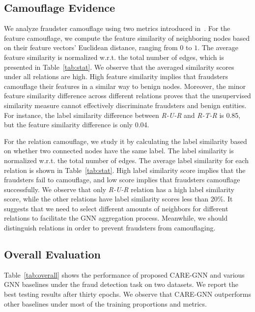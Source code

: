 \subsection{Camouflage Evidence}
\label{sec05:camoflage}
We analyze fraudster camouflage using two metrics introduced in~\cite{liu2020alleviating}. 
For the feature camouflage, we compute the feature similarity of neighboring nodes based on their feature vectors' Euclidean distance, ranging from $0$ to $1$.
The average feature similarity is normalized w.r.t. the total number of edges, which is presented in Table~\ref{tab:stat}.
We observe that the averaged similarity scores under all relations are high.
High feature similarity implies that fraudsters camouflage their features in a similar way to benign nodes.
Moreover, the minor feature similarity difference across different relations proves that the unsupervised similarity measure cannot effectively discriminate fraudsters and benign entities.
For instance, the label similarity difference between \textit{R-U-R} and \textit{R-T-R} is 0.85, but the feature similarity difference is only 0.04.  

For the relation camouflage, we study it by calculating the label similarity based on whether two connected nodes have the same label.
The label similarity is normalized w.r.t. the total number of edges.
The average label similarity for each relation is shown in Table~\ref{tab:stat}.
High label similarity score implies that the fraudsters fail to camouflage, and low score implies that fraudsters camouflage successfully.
We observe that only \textit{R-U-R} relation has a high label similarity score, while the other relations have label similarity scores less than 20\%.
It suggests that we need to select different amounts of neighbors for different relations to facilitate the GNN aggregation process.
Meanwhile, we should distinguish relations in order to prevent fraudsters from camouflaging.

\subsection{Overall Evaluation}
\label{sec05:overall_eval}

Table~\ref{tab:overall} shows the performance of proposed CARE-GNN and various GNN baselines under the fraud detection task on two datasets.
We report the best testing results after thirty epochs. 
We observe that CARE-GNN outperforms other baselines under most of the training proportions and metrics.

